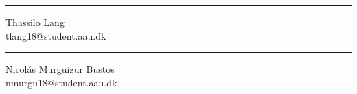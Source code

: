 \noindent
\begin{minipage}[b]{0.45\textwidth}
	\centering
	\rule{\textwidth}{0.5pt}
	Thassilo Lang\\
	{\footnotesize tlang18@student.aau.dk}
\end{minipage}
\hfill
\begin{minipage}[b]{0.45\textwidth}
	\centering
	\rule{\textwidth}{0.5pt}
	Nicolás Murguizur Bustos\\
	{\footnotesize nmurgu18@student.aau.dk}
\end{minipage}

